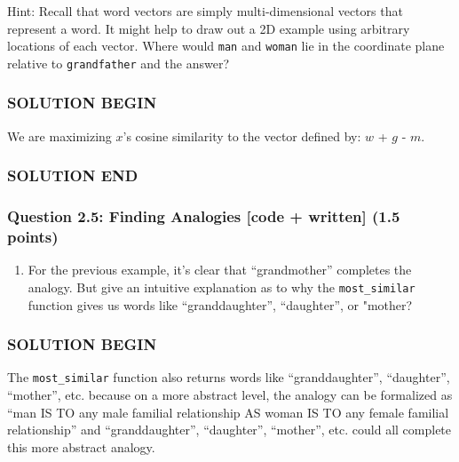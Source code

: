 \documentclass[11pt]{article}
\providecommand{\tightlist}{%
      \setlength{\itemsep}{0pt}\setlength{\parskip}{0pt}}
\begin{document}
Hint: Recall that word vectors are simply multi-dimensional vectors that
represent a word. It might help to draw out a 2D example using arbitrary
locations of each vector. Where would \texttt{man} and \texttt{woman}
lie in the coordinate plane relative to \texttt{grandfather} and the
answer?

    \hypertarget{solution-begin}{%
\subsubsection{SOLUTION BEGIN}\label{solution-begin}}

We are maximizing \(x\)'s cosine similarity to the vector defined by:
\(w\) + \(g\) - \(m\).

\hypertarget{solution-end}{%
\subsubsection{SOLUTION END}\label{solution-end}}

    \hypertarget{question-2.5-finding-analogies-code-written-1.5-points}{%
\subsubsection{Question 2.5: Finding Analogies {[}code + written{]} (1.5
points)}\label{question-2.5-finding-analogies-code-written-1.5-points}}

\begin{enumerate}
\def\labelenumi{\alph{enumi}.}
\tightlist
\item
  For the previous example, it's clear that ``grandmother'' completes
  the analogy. But give an intuitive explanation as to why the
  \texttt{most\_similar} function gives us words like ``granddaughter'',
  ``daughter'', or "mother?
\end{enumerate}

    \hypertarget{solution-begin}{%
\subsubsection{SOLUTION BEGIN}\label{solution-begin}}

The \texttt{most\_similar} function also returns words like
``granddaughter'', ``daughter'', ``mother'', etc. because on a more
abstract level, the analogy can be formalized as ``man IS TO any male
familial relationship AS woman IS TO any female familial relationship''
and ``granddaughter'', ``daughter'', ``mother'', etc. could all complete
this more abstract analogy.
\end{document}
